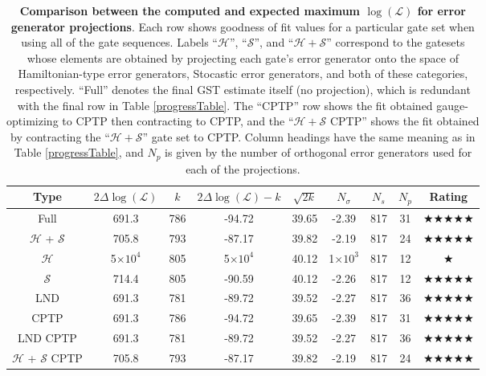 \documentclass{article}[11pt]
\providecommand{\e}[1]{\ensuremath{\times 10^{#1}}}
\begin{document}
{\begin{table}[h]
\begin{center}
\begin{tabular}[l]{|c|c|c|c|c|c|c|c|c|}
\hline
Type & $2\Delta\log(\mathcal{L})$ & $k$ & $2\Delta\log(\mathcal{L})-k$ & $\sqrt{2k}$ & $N_\sigma$ & $N_s$ & $N_p$ & Rating \\ \hline
Full & 691.3 & 786 & -94.72 & 39.65 & -2.39 & 817 & 31 & $\bigstar\bigstar\bigstar\bigstar\bigstar$ \\ \hline
$\mathcal{H}$ + $\mathcal{S}$ & 705.8 & 793 & -87.17 & 39.82 & -2.19 & 817 & 24 & $\bigstar\bigstar\bigstar\bigstar\bigstar$ \\ \hline
$\mathcal{H}$ & 5\e{4} & 805 & 5\e{4} & 40.12 & 1\e{3} & 817 & 12 & $\bigstar$ \\ \hline
$\mathcal{S}$ & 714.4 & 805 & -90.59 & 40.12 & -2.26 & 817 & 12 & $\bigstar\bigstar\bigstar\bigstar\bigstar$ \\ \hline
LND & 691.3 & 781 & -89.72 & 39.52 & -2.27 & 817 & 36 & $\bigstar\bigstar\bigstar\bigstar\bigstar$ \\ \hline
CPTP & 691.3 & 786 & -94.72 & 39.65 & -2.39 & 817 & 31 & $\bigstar\bigstar\bigstar\bigstar\bigstar$ \\ \hline
LND CPTP & 691.3 & 781 & -89.72 & 39.52 & -2.27 & 817 & 36 & $\bigstar\bigstar\bigstar\bigstar\bigstar$ \\ \hline
$\mathcal{H}$ + $\mathcal{S}$ CPTP & 705.8 & 793 & -87.17 & 39.82 & -2.19 & 817 & 24 & $\bigstar\bigstar\bigstar\bigstar\bigstar$ \\ \hline
\end{tabular}

\caption{\textbf{Comparison between the computed and expected maximum $\log(\mathcal{L})$ for error generator projections}.  Each row shows goodness of fit values for a particular gate set when using all of the gate sequences.  Labels ``$\mathcal{H}$'', ``$\mathcal{S}$'', and ``$\mathcal{H} + \mathcal{S}$'' correspond to the gatesets whose elements are obtained by projecting each gate's error generator onto the space of Hamiltonian-type error generators, Stocastic error generators, and both of these categories, respectively. ``Full'' denotes the final GST estimate itself (no projection), which is redundant with the final row in Table \ref{progressTable}.  The ``CPTP'' row shows the fit obtained gauge-optimizing to CPTP then contracting to CPTP, and the ``$\mathcal{H} + \mathcal{S}$ CPTP'' shows the fit obtained by contracting the ``$\mathcal{H} + \mathcal{S}$'' gate set to CPTP.  Column headings have the same meaning as in Table \ref{progressTable}, and $N_p$ is given by the number of orthogonal error generators used for each of the projections.\label{logLErrgenProjectionTable}}
\end{center}
\end{table}


}
\end{document}

